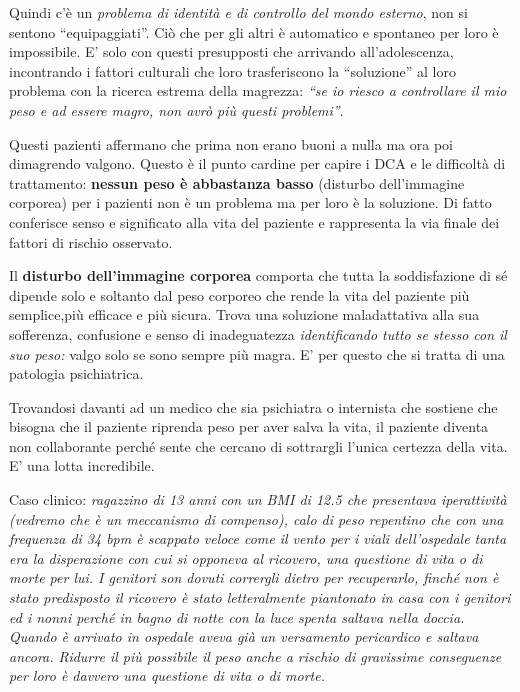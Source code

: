\documentclass[]{article}
\begin{document}
Quindi c'è un \emph{problema di identità e di controllo del mondo
esterno}, non si sentono ``equipaggiati''. Ciò che per gli altri è
automatico e spontaneo per loro è impossibile. E' solo con questi
presupposti che arrivando all'adolescenza, incontrando i fattori
culturali che loro trasferiscono la ``soluzione'' al loro problema con
la ricerca estrema della magrezza: \emph{``se io riesco a controllare il
mio peso e ad essere magro, non avrò più questi problemi''}.

Questi pazienti affermano che prima non erano buoni a nulla ma ora poi
dimagrendo valgono. Questo è il punto cardine per capire i DCA e le
difficoltà di trattamento: \textbf{nessun peso è abbastanza basso}
(disturbo dell'immagine corporea) per i pazienti non è un problema ma
per loro è la soluzione. Di fatto conferisce senso e significato alla
vita del paziente e rappresenta la via finale dei fattori di rischio
osservato.

Il \textbf{disturbo dell'immagine corporea} comporta che tutta la
soddisfazione di sé dipende solo e soltanto dal peso corporeo che rende
la vita del paziente più semplice,più efficace e più sicura. Trova una
soluzione maladattativa alla sua sofferenza, confusione e senso di
inadeguatezza \emph{identificando tutto se stesso con il suo peso:}
valgo solo se sono sempre più magra. E' per questo che si tratta di una
patologia psichiatrica.

Trovandosi davanti ad un medico che sia psichiatra o internista che
sostiene che bisogna che il paziente riprenda peso per aver salva la
vita, il paziente diventa non collaborante perché sente che cercano di
sottrargli l'unica certezza della vita. E' una lotta incredibile.

Caso clinico: \emph{ragazzino di 13 anni con un BMI di 12.5 che
presentava iperattività (vedremo che è un meccanismo di compenso), calo
di peso repentino che con una frequenza di 34 bpm è scappato veloce come
il vento per i viali dell'ospedale tanta era la disperazione con cui si
opponeva al ricovero, una questione di vita o di morte per lui. I
genitori son dovuti corrergli dietro per recuperarlo, finché non è stato
predisposto il ricovero è stato letteralmente piantonato in casa con i
genitori ed i nonni perché in bagno di notte con la luce spenta saltava
nella doccia. Quando è arrivato in ospedale aveva già un versamento
pericardico e saltava ancora. Ridurre il più possibile il peso anche a
rischio di gravissime conseguenze per loro è davvero una questione di
vita o di morte.}
\end{document}
